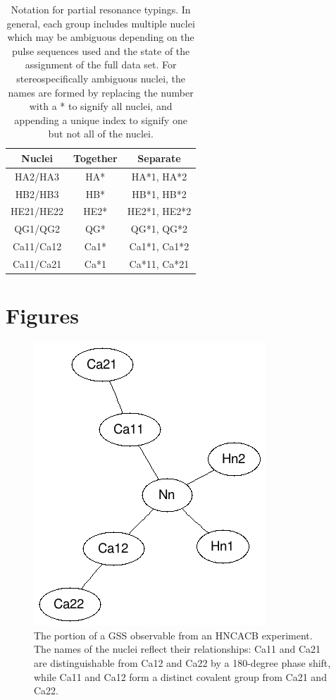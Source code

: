 \begin{table}
  \begin{tabular}{ | c | c | c |}
    \hline
    Nuclei      &  Together &  Separate      \\  \hline 
    HA2/HA3     &  HA*      &  HA*1, HA*2    \\  \hline 
    HB2/HB3     &  HB*      &  HB*1, HB*2    \\  \hline 
    HE21/HE22   &  HE2*     &  HE2*1, HE2*2  \\  \hline 
    QG1/QG2     &  QG*      &  QG*1, QG*2    \\  \hline
    Ca11/Ca12   &  Ca1*     &  Ca1*1, Ca1*2  \\  \hline
    Ca11/Ca21   &  Ca*1     &  Ca*11, Ca*21  \\  \hline
  \end{tabular}
  \caption[Notation for partial resonance typings.]
          {Notation for partial resonance typings.
           In general, each group includes multiple nuclei which may be 
           ambiguous depending on the pulse sequences used and the 
           state of the assignment of the full data set.
           For stereospecifically ambiguous nuclei, the names are formed by
           replacing the number with a * to signify all nuclei, and appending
           a unique index to signify one but not all of the nuclei.}
  \label{partial_typing_notation}
\end{table}


\clearpage
\section{Figures}

\begin{figure}[h]
  \includegraphics[scale=0.75]{figures/generic_hncacb}
  \caption[The portion of a GSS observable from an HNCACB experiment.]
          {The portion of a GSS observable from an HNCACB experiment.
           The names of the nuclei reflect their relationships: Ca11 and Ca21 are
           distinguishable from Ca12 and Ca22 by a 180-degree phase shift,
           while Ca11 and Ca12 form a distinct covalent group from Ca21 and Ca22.}
  \label{generic_hncacb}
\end{figure}    

